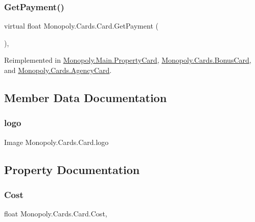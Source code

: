 \subsubsection{\texorpdfstring{Get\+Payment()}{GetPayment()}}
{\footnotesize\ttfamily virtual float Monopoly.\+Cards.\+Card.\+Get\+Payment (\begin{DoxyParamCaption}{ }\end{DoxyParamCaption})\hspace{0.3cm}{\ttfamily [inline]}, {\ttfamily [virtual]}}



Reimplemented in \mbox{\hyperlink{class_monopoly_1_1_main_1_1_property_card_a372062ee95b60c03637cdd08667d74ba}{Monopoly.\+Main.\+Property\+Card}}, \mbox{\hyperlink{class_monopoly_1_1_cards_1_1_bonus_card_af017cfbb4591f7afeca653b87aae9bb1}{Monopoly.\+Cards.\+Bonus\+Card}}, and \mbox{\hyperlink{class_monopoly_1_1_cards_1_1_agency_card_a7463b9f93db864ea03b2e0d6b2973e41}{Monopoly.\+Cards.\+Agency\+Card}}.



\subsection{Member Data Documentation}
\mbox{\label{class_monopoly_1_1_cards_1_1_card_a84da6fc446a55518f9bdf8fa7eef9057}} 
\subsubsection{\texorpdfstring{logo}{logo}}
{\footnotesize\ttfamily Image Monopoly.\+Cards.\+Card.\+logo}



\subsection{Property Documentation}
\mbox{\label{class_monopoly_1_1_cards_1_1_card_a67df91aa53596b2ce61ef2c3386ddd7c}} 
\subsubsection{\texorpdfstring{Cost}{Cost}}
{\footnotesize\ttfamily float Monopoly.\+Cards.\+Card.\+Cost\hspace{0.3cm}{\ttfamily [get]}, {}}

